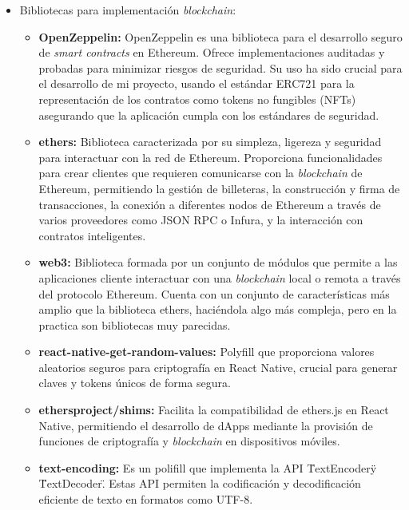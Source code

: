 \begin{itemize}

\item Bibliotecas para implementación \textit{blockchain}:
\begin{itemize}

\item \textbf{OpenZeppelin:} OpenZeppelin es una biblioteca para el desarrollo seguro de \textit{smart contracts} en Ethereum. Ofrece implementaciones auditadas y probadas para minimizar riesgos de seguridad.
Su uso ha sido crucial para el desarrollo de mi proyecto, usando el estándar ERC721 para la representación de los contratos como tokens no fungibles (NFTs) asegurando que la aplicación cumpla con los estándares de seguridad.

\item \textbf{ethers:} Biblioteca caracterizada por su simpleza, ligereza y seguridad para interactuar con la red de Ethereum. Proporciona funcionalidades para crear clientes que requieren comunicarse con la \textit{blockchain} de Ethereum, permitiendo la gestión de billeteras, la construcción y firma de transacciones, la conexión a diferentes nodos de Ethereum a través de varios proveedores como JSON RPC o Infura, y la interacción con contratos inteligentes.

\item \textbf{web3:} Biblioteca formada por un conjunto de módulos que permite a las aplicaciones cliente interactuar con una \textit{blockchain} local o remota a través del protocolo Ethereum. 
Cuenta con un conjunto de características más amplio que la biblioteca ethers, haciéndola algo más compleja, pero en la practica son bibliotecas muy parecidas.

\item \textbf{react-native-get-random-values:} Polyfill que proporciona valores aleatorios seguros para criptografía en React Native, crucial para generar claves y tokens únicos de forma segura.

\item \textbf{ethersproject/shims:} Facilita la compatibilidad de ethers.js en React Native, permitiendo el desarrollo de dApps mediante la provisión de funciones de criptografía y \textit{blockchain} en dispositivos móviles.

\item \textbf{text-encoding:} Es un polifill que implementa la API \"TextEncoder\" y \"TextDecoder\". Estas API permiten la codificación y decodificación eficiente de texto en formatos como UTF-8.


\end{itemize}
\end{itemize}
